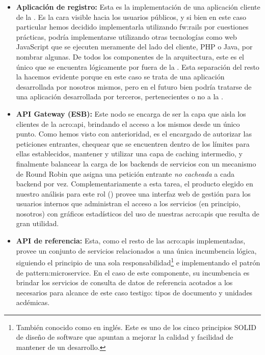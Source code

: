 \begin{itemize}
  \item \textbf{Aplicación de registro:} Esta es la implementación de una aplicación cliente de la \cloud. Es la cara visible hacia los usuarios públicos, y si bien en este caso particular hemos decidido implementarla utilizando \gls{fw:rails} por cuestiones prácticas, podría implementarse utilizando otras tecnologías como  web JavaScript que se ejecuten meramente del lado del cliente, PHP o Java, por nombrar algunas. De todos los componentes de la arquitectura, este es el único que se encuentra lógicamente por fuera de la \cloud. Esta separación del resto la hacemos evidente porque en este caso se trata de una aplicación desarrollada por nosotros mismos, pero en el futuro bien podría tratarse de una aplicación desarrollada por terceros, pertenecientes o no a la \unlp.

  \item \textbf{API Gateway (ESB):} Este nodo se encarga de ser la capa que aisla los clientes de la \gls{acro:api}, brindando el acceso a los mismos desde un único punto. Como hemos visto con anterioridad, es el encargado de autorizar las peticiones entrantes, chequear que se encuentren dentro de los límites para ellas establecidos, mantener y utilizar una capa de caching intermedio, y finalmente balancear la carga de los backends de servicios con un mecanismo de Round Robin que asigna una petición entrante \textit{no cacheada} a cada backend por vez. Complementariamente a esta tarea, el producto elegido en nuestro análisis para este rol () provee una interfaz web de gestión para los usuarios internos que administran el acceso a los servicios (en principio, nosotros) con gráficos estadísticos del uso de nuestras \glspl{acro:api} que resulta de gran utilidad.

  \item \textbf{API de referencia:} Esta, como el resto de las \glspl{acro:api} implementadas, provee un conjunto de servicios relacionados a una única incumbencia lógica, siguiendo el principio de una sola responsabilidad\footnote{También conocido como  en inglés. Este es uno de los cinco principios SOLID de diseño de software que apuntan a mejorar la calidad y facilidad de mantener de un desarrollo.} e implementando el patrón de \gls{pattern:microservice}. En el caso de este componente, su incumbencia es brindar los servicios de consulta de datos de referencia acotados a los necesarios para alcance de este caso testigo: tipos de documento y unidades acdémicas.


\end{itemize}
